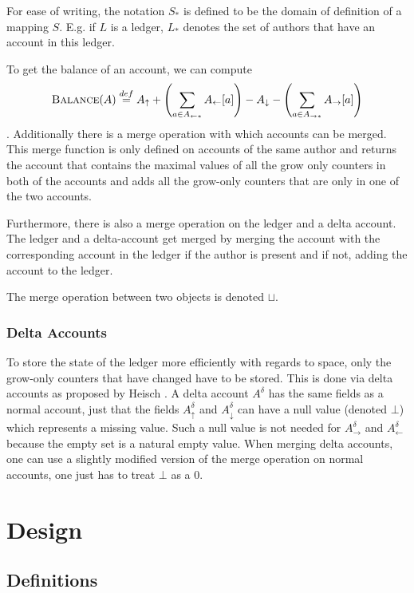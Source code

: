 \documentclass{article}
\begin{document}
For ease of writing, the notation $S_*$ is defined to be the domain of definition of a mapping $S$. E.g. if $L$ is a ledger, $L_*$ denotes the set of authors that have an account in this ledger. 

To get the balance of an account, we can compute \[\textsc{Balance}(A) \stackrel{def}{=} A_\uparrow + \left(\sum_{a \in A_{\leftarrow*}} A_\leftarrow[a]\right) - A_\downarrow - \left(\sum_{a \in A_{\rightarrow*}} A_\rightarrow[a]\right)\].
Additionally there is a merge operation with which accounts can be merged. This merge function is only defined on accounts of the same author and returns the account that contains the maximal values of all the grow only counters in both of the accounts and adds all the grow-only counters that are only in one of the two accounts. 

Furthermore, there is also a merge operation on the ledger and a delta account. The ledger and a delta-account get merged by merging the account with the corresponding account in the ledger if the author is present and if not, adding the account to the ledger. 

The merge operation between two objects is denoted $\sqcup$.

\subsubsection{Delta Accounts}
To store the state of the ledger more efficiently with regards to space, only the grow-only counters that have changed have to be stored. This is done via delta accounts as proposed by Heisch \cite{delta-goc-ledger-heisch}. A delta account $A^\delta$ has the same fields as a normal account, just that the fields $A^\delta_\uparrow$ and $A^\delta_\downarrow$ can have a null value (denoted $\bot$) which represents a missing value. Such a null value is not needed for $A^\delta_\rightarrow$ and $A^\delta_\leftarrow$ because the empty set is a natural empty value. When merging delta accounts, one can use a slightly modified version of the merge operation on normal accounts, one just has to treat $\bot$ as a 0.


\section{Design}

\subsection{Definitions}
\end{document}
